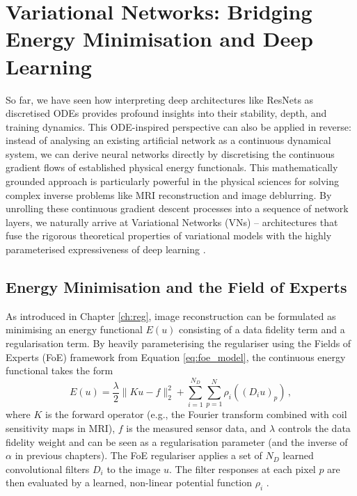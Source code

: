 \section{Variational Networks: Bridging Energy Minimisation and Deep Learning}
\label{sec:vn_energy}

So far, we have seen how interpreting deep architectures like ResNets as discretised ODEs provides profound insights into their stability, depth, and training dynamics. This ODE-inspired perspective can also be applied in reverse: instead of analysing an existing artificial network as a continuous dynamical system, we can derive neural networks directly by discretising the continuous gradient flows of established physical energy functionals. This mathematically grounded approach is particularly powerful in the physical sciences for solving complex inverse problems like MRI reconstruction and image deblurring. By unrolling these continuous gradient descent processes into a sequence of network layers, we naturally arrive at Variational Networks (VNs) -- architectures that fuse the rigorous theoretical properties of variational models with the highly parameterised expressiveness of deep learning \cite{kobler2017variational,hammernik2018learning}.

\subsection{Energy Minimisation and the Field of Experts}

As introduced in Chapter \ref{ch:reg}, image reconstruction can be formulated as minimising an energy functional $E(u)$ consisting of a data fidelity term and a regularisation term. By heavily parameterising the regulariser using the Fields of Experts (FoE) framework from Equation \eqref{eq:foe_model}, the continuous energy functional takes the form
\begin{equation}
    E(u) = \frac{\lambda}{2} \|K u - f\|_2^2 + \sum_{i=1}^{N_D} \sum_{p=1}^N \rho_i\left((D_i u)_p\right) \, ,
    \label{eq:vn_energy}
\end{equation}
where $K$ is the forward operator (e.g., the Fourier transform combined with coil sensitivity maps in MRI), $f$ is the measured sensor data, and $\lambda$ controls the data fidelity weight and can be seen as a regularisation parameter (and the inverse of $\alpha$ in previous chapters). The FoE regulariser applies a set of $N_D$ learned convolutional filters $D_i$ to the image $u$. The filter responses at each pixel $p$ are then evaluated by a learned, non-linear potential function $\rho_i$ \cite{kobler2017variational}.

